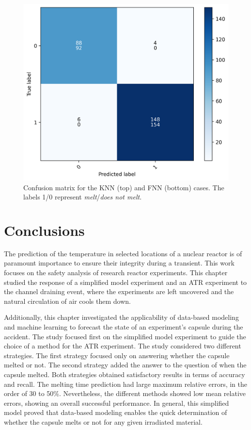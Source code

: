 \begin{figure}[htbp!] %
  \centering
  \includegraphics[width=0.45\linewidth]{figures/atr-classification_cnfm}
  \hfill
  \caption{Confusion matrix for the KNN (top) and FNN (bottom) cases. The labels 1/0 represent \textit{melt}/\textit{does not melt}.}
  \label{fig:atr-class-1}
\end{figure}


\section{Conclusions}

The prediction of the temperature in selected locations of a nuclear reactor is of paramount importance to ensure their integrity during a transient.
This work focuses on the safety analysis of research reactor experiments.
This chapter studied the response of a simplified model experiment and an ATR experiment to the channel draining event, where the experiments are left uncovered and the natural circulation of air cools them down.

Additionally, this chapter investigated the applicability of data-based modeling and machine learning to forecast the state of an experiment's capsule during the accident.
The study focused first on the simplified model experiment to guide the choice of a method for the ATR experiment.
The study considered two different strategies.
The first strategy focused only on answering whether the capsule melted or not.
The second strategy added the answer to the question of when the capsule melted.
Both strategies obtained satisfactory results in terms of accuracy and recall.
The melting time prediction had large maximum relative errors, in the order of 30 to 50\%.
Nevertheless, the different methods showed low mean relative errors, showing an overall successful performance.
In general, this simplified model proved that data-based modeling enables the quick determination of whether the capsule melts or not for any given irradiated material.

